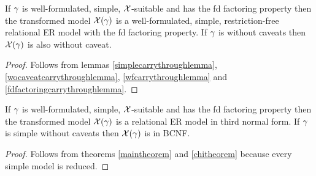 \begin{theorem}
\label{chitheorem}
If $\gamma$ is well-formulated, simple, $\mathcal{X}$-suitable and has the fd factoring property
then the transformed model $\mathcal{X}(\gamma)$ is a well-formulated, simple, restriction-free relational ER model with the fd factoring property.   
If $\gamma$ is without caveats then $\mathcal{X}(\gamma)$ is also without caveat.
\end{theorem}
\begin{proof}
Follows from lemmas \ref{simplecarrythroughlemma}, \ref{wocaveatcarrythroughlemma}, \ref{wfcarrythroughlemma} and
\ref{fdfactoringcarrythroughlemma}.
\end{proof}

\begin{corollary}
\label{goalcorollary}
If $\gamma$ is well-formulated, simple, $\mathcal{X}$-suitable and has the fd factoring property
then the transformed model $\mathcal{X}(\gamma)$ is a  relational ER model in third normal form.  
If $\gamma$ is simple without caveats then $\mathcal{X}(\gamma)$ is in BCNF.
\end{corollary}
\begin{proof}
Follows from theorems \ref{maintheorem} and \ref{chitheorem} because every simple model is reduced.
\end{proof}
